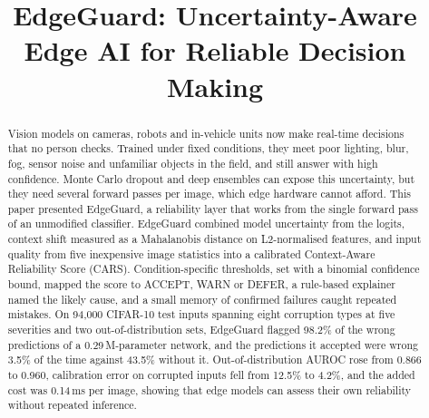 \documentclass[conference]{IEEEtran}
\begin{document}
\title{EdgeGuard: Uncertainty-Aware Edge AI for Reliable Decision Making}

\author{
}

\maketitle

\begin{abstract}
Vision models on cameras, robots and in-vehicle units now make real-time decisions that no person checks. Trained under fixed conditions, they meet poor lighting, blur, fog, sensor noise and unfamiliar objects in the field, and still answer with high confidence. Monte Carlo dropout and deep ensembles can expose this uncertainty, but they need several forward passes per image, which edge hardware cannot afford. This paper presented EdgeGuard, a reliability layer that works from the single forward pass of an unmodified classifier. EdgeGuard combined model uncertainty from the logits, context shift measured as a Mahalanobis distance on L2-normalised features, and input quality from five inexpensive image statistics into a calibrated Context-Aware Reliability Score (CARS). Condition-specific thresholds, set with a binomial confidence bound, mapped the score to ACCEPT, WARN or DEFER, a rule-based explainer named the likely cause, and a small memory of confirmed failures caught repeated mistakes. On 94{,}000 CIFAR-10 test inputs spanning eight corruption types at five severities and two out-of-distribution sets, EdgeGuard flagged 98.2\% of the wrong predictions of a 0.29\,M-parameter network, and the predictions it accepted were wrong 3.5\% of the time against 43.5\% without it. Out-of-distribution AUROC rose from 0.866 to 0.960, calibration error on corrupted inputs fell from 12.5\% to 4.2\%, and the added cost was 0.14\,ms per image, showing that edge models can assess their own reliability without repeated inference.
\end{abstract}
\end{document}

